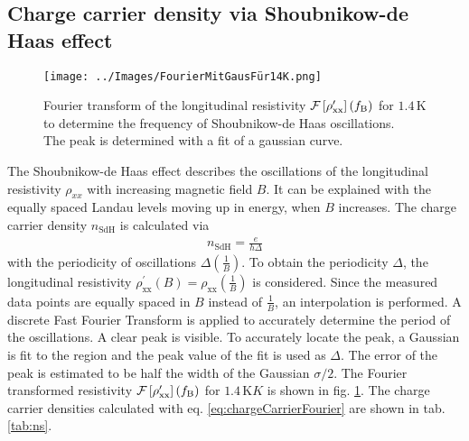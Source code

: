 \subsection{Charge carrier density via Shoubnikow-de Haas effect}
\begin{figure}[h]
    \centering
    \texttt{[image: ../Images/FourierMitGausFür14K.png]}
    \caption{Fourier transform of the longitudinal resistivity 
    $\mathcal{F}\left[ \rho^\prime_\text{xx}\right]\left(f_\text B\right)$ 
    for $1.4\,\text{K}$ to determine the frequency of Shoubnikow-de Haas oscillations.\\
    The peak is determined with a fit of a gaussian curve.
    }
    \label{fig:Fourier}
\end{figure}
The Shoubnikow-de Haas effect describes the oscillations of the longitudinal resistivity $\rho_{xx}$ with increasing magnetic field $B$.
It can be explained with the equally spaced Landau levels moving up in energy, when $B$ increases.
The charge carrier density $n_\text{SdH}$ is calculated via
\begin{align}
    n_\text{SdH} = \frac{e}{h\Delta}
    \label{eq:chargeCarrierFourier}
\end{align} 
with the periodicity of oscillations $\Delta\left(\frac{1}{B}\right)$.
To obtain the periodicity $\Delta$, the longitudinal resistivity $\rho^\prime_\text{xx}\left(B\right)=\rho_\text{xx}\left(\frac{1}{B}\right)$ is considered.
Since the measured data points are equally spaced in $B$ instead of $\frac{1}{B}$, an interpolation is performed.
A discrete Fast Fourier Transform is applied to accurately determine the period of the oscillations.
A clear peak is visible.
To accurately locate the peak, a Gaussian is fit to the region and the peak value of the fit is used as $\Delta$.
The error of the peak is estimated to be half the width of the Gaussian $\sigma / 2$.
The Fourier transformed resistivity $\mathcal{F}\left[ \rho^\prime_\text{xx}\right]\left(f_\text B\right)$ for $1.4\,\text{K}K$ is shown in fig. \ref{fig:Fourier}.
The charge carrier densities calculated with eq. \ref{eq:chargeCarrierFourier} are shown in tab. \ref{tab:ns}.
